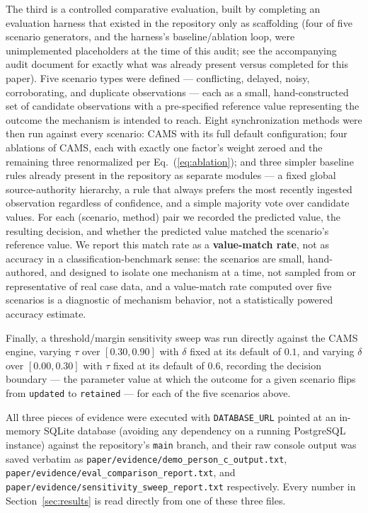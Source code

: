 \documentclass[conference]{IEEEtran}
\begin{document}
The third is a controlled comparative evaluation, built by completing an
evaluation harness that existed in the repository only as scaffolding (four
of five scenario generators, and the harness's baseline/ablation loop, were
unimplemented placeholders at the time of this audit; see the accompanying
audit document for exactly what was already present versus completed for
this paper). Five scenario types were defined --- conflicting, delayed,
noisy, corroborating, and duplicate observations --- each as a small,
hand-constructed set of candidate observations with a pre-specified
reference value representing the outcome the mechanism is intended to
reach. Eight synchronization methods were then run against every scenario:
CAMS with its full default configuration; four ablations of CAMS, each with
exactly one factor's weight zeroed and the remaining three renormalized per
Eq.~(\ref{eq:ablation}); and three simpler baseline rules already present in
the repository as separate modules --- a fixed global source-authority
hierarchy, a rule that always prefers the most recently ingested
observation regardless of confidence, and a simple majority vote over
candidate values. For each (scenario, method) pair we recorded the
predicted value, the resulting decision, and whether the predicted value
matched the scenario's reference value. We report this match rate as a
\textbf{value-match rate}, not as accuracy in a classification-benchmark
sense: the scenarios are small, hand-authored, and designed to isolate one
mechanism at a time, not sampled from or representative of real case data,
and a value-match rate computed over five scenarios is a diagnostic of
mechanism behavior, not a statistically powered accuracy estimate.

Finally, a threshold/margin sensitivity sweep was run directly against the
CAMS engine, varying $\tau$ over $[0.30, 0.90]$ with $\delta$ fixed at its
default of $0.1$, and varying $\delta$ over $[0.00, 0.30]$ with $\tau$
fixed at its default of $0.6$, recording the decision boundary --- the
parameter value at which the outcome for a given scenario flips from
\texttt{updated} to \texttt{retained} --- for each of the five scenarios
above.

All three pieces of evidence were executed with \texttt{DATABASE\_URL}
pointed at an in-memory SQLite database (avoiding any dependency on a
running PostgreSQL instance) against the repository's \texttt{main} branch,
and their raw console output was saved verbatim as
\texttt{paper/evidence/demo\_person\_c\_output.txt},
\texttt{paper/evidence/eval\_comparison\_report.txt}, and
\texttt{paper/evidence/sensitivity\_sweep\_report.txt} respectively. Every
number in Section~\ref{sec:results} is read directly from one of these
three files.
\end{document}
